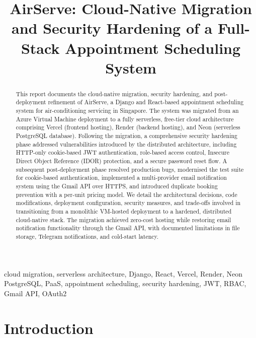 \documentclass[conference]{IEEEtran}
\begin{document}
\title{AirServe: Cloud-Native Migration and Security Hardening of a Full-Stack Appointment Scheduling System}

\author{
}

\maketitle

\begin{abstract}
This report documents the cloud-native migration, security hardening, and post-deployment refinement of AirServe, a Django and React-based appointment scheduling system for air-conditioning servicing in Singapore. The system was migrated from an Azure Virtual Machine deployment to a fully serverless, free-tier cloud architecture comprising Vercel (frontend hosting), Render (backend hosting), and Neon (serverless PostgreSQL database). Following the migration, a comprehensive security hardening phase addressed vulnerabilities introduced by the distributed architecture, including HTTP-only cookie-based JWT authentication, role-based access control, Insecure Direct Object Reference (IDOR) protection, and a secure password reset flow. A subsequent post-deployment phase resolved production bugs, modernised the test suite for cookie-based authentication, implemented a multi-provider email notification system using the Gmail API over HTTPS, and introduced duplicate booking prevention with a per-unit pricing model. We detail the architectural decisions, code modifications, deployment configuration, security measures, and trade-offs involved in transitioning from a monolithic VM-hosted deployment to a hardened, distributed cloud-native stack. The migration achieved zero-cost hosting while restoring email notification functionality through the Gmail API, with documented limitations in file storage, Telegram notifications, and cold-start latency.
\end{abstract}

\begin{IEEEkeywords}
cloud migration, serverless architecture, Django, React, Vercel, Render, Neon PostgreSQL, PaaS, appointment scheduling, security hardening, JWT, RBAC, Gmail API, OAuth2
\end{IEEEkeywords}

\section{Introduction}
\end{document}
